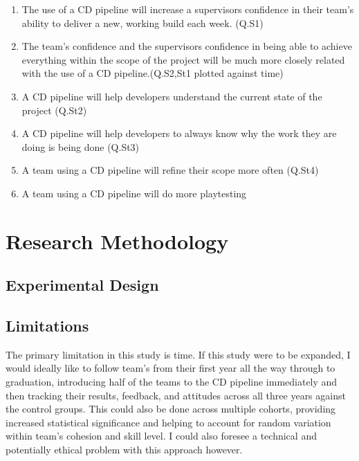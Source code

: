 \documentclass[lettersize,journal]{IEEEtran}
\begin{document}
    \begin{enumerate}
        \item The use of a CD pipeline will increase a supervisors confidence in their team's ability to deliver a new, working build each week. (Q.S1)
        \item The team's confidence and the supervisors confidence in being able to achieve everything within the scope of the project will be much more closely related with the use of a CD pipeline.(Q.S2,St1 plotted against time)
        \item A CD pipeline will help developers understand the current state of the project (Q.St2)
        \item A CD pipeline will help developers to always know why the work they are doing is being done (Q.St3)
        \item A team using a CD pipeline will refine their scope more often (Q.St4)
        \item A team using a CD pipeline will do more playtesting
    \end{enumerate}

\section{Research Methodology}
    \subsection{Experimental Design}
        

    \subsection{Limitations}
        The primary limitation in this study is time. If this study were to be expanded, I would ideally like to follow team's from their first year all the way through to graduation, introducing half of the teams to the CD pipeline immediately and then tracking their results, feedback, and attitudes across all three years against the control groups. This could also be done across multiple cohorts, providing increased statistical significance and helping to account for random variation within team's cohesion and skill level. I could also foresee a technical and potentially ethical problem with this approach however.
        
\end{document}
